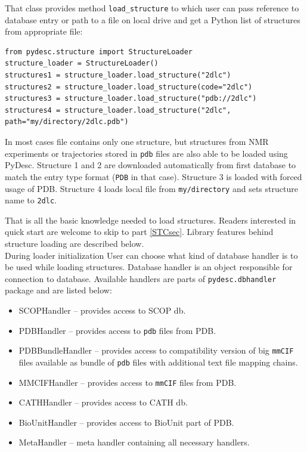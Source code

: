 \documentclass{article}
\begin{document}
    That class provides method \texttt{load\_structure} to which user can pass reference to database entry or path to a file on local drive and get a Python list of structures from appropriate file:

\begin{lstlisting}
from pydesc.structure import StructureLoader
structure_loader = StructureLoader()
structures1 = structure_loader.load_structure("2dlc")
structures2 = structure_loader.load_structure(code="2dlc")
structures3 = structure_loader.load_structure("pdb://2dlc")
structures4 = structure_loader.load_structure("2dlc", path="my/directory/2dlc.pdb")
\end{lstlisting}

    In most cases file contains only one structure, but structures from NMR experiments or trajectories stored in \texttt{pdb} files are also able to be loaded using PyDesc.
    Structure 1 and 2 are downloaded automatically from first database to match the entry type format (\texttt{PDB} in that case). Structure 3 is loaded with forced usage of PDB. Structure 4 loads local file from \texttt{my/directory} and sets structure name to \texttt{2dlc}.
    
    That is all the basic knowledge needed to load structures. Readers interested in quick start are welcome to skip to part \ref{STCsec}. Library features behind structure loading are described below.\\

    During loader initialization User can choose what kind of database handler is to be used while loading structures. Database handler is an object responsible for connection to database. Available handlers are parts of \texttt{pydesc.dbhandler} package and are listed below:
\begin{itemize}
    \item SCOPHandler -- provides access to SCOP db.
    \item PDBHandler -- provides access to \texttt{pdb} files from PDB.
    \item PDBBundleHandler -- provides access to compatibility version of big \texttt{mmCIF} files available as bundle of \texttt{pdb} files with additional text file mapping chains.
    \item MMCIFHandler -- provides access to \texttt{mmCIF} files from PDB.
    \item CATHHandler -- provides access to CATH db.
    \item BioUnitHandler -- provides access to BioUnit part of PDB.
    \item MetaHandler -- meta handler containing all necessary handlers.
\end{itemize}
\end{document}
